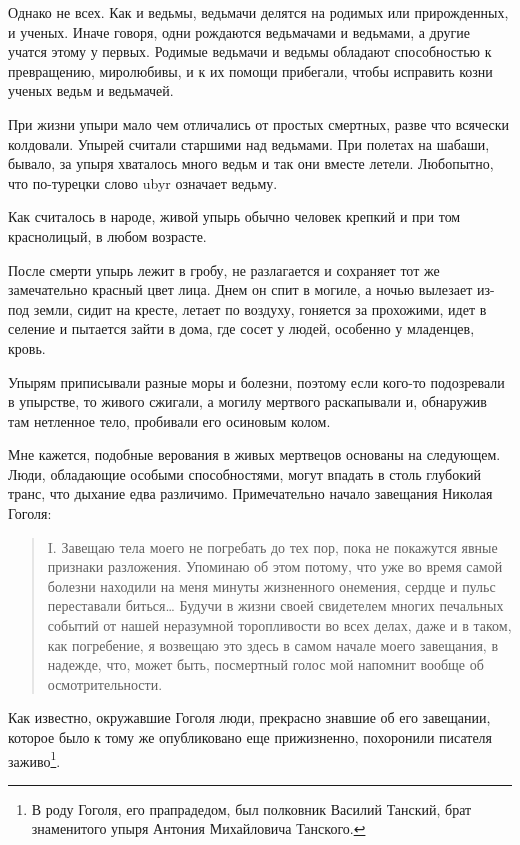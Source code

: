 \documentclass[a5paper,11pt,openany]{article}
\begin{document}
 Однако не всех. Как и ведьмы, ведьмачи делятся на родимых или прирожденных, и ученых. Иначе говоря, одни рождаются ведьмачами и ведьмами, а другие учатся этому у первых. Родимые ведьмачи и ведьмы обладают способностью к превращению, миролюбивы, и к их помощи прибегали, чтобы исправить козни ученых ведьм и ведьмачей.

   При жизни упыри мало чем отличались от простых смертных, разве что всячески колдовали. Упырей считали старшими над ведьмами. При полетах на шабаши, бывало, за упыря хваталось много ведьм и так они вместе летели. Любопытно, что по-турецки слово ubyr означает ведьму.

   Как считалось в народе, живой упырь обычно человек крепкий и при том краснолицый, в любом возрасте.

   После смерти упырь лежит в гробу, не разлагается и сохраняет тот же замечательно красный цвет лица. Днем он спит в могиле, а ночью вылезает из-под земли, сидит на кресте, летает по воздуху, гоняется за прохожими, идет в селение и пытается зайти в дома, где сосет у людей, особенно у младенцев, кровь.

   Упырям приписывали разные моры и болезни, поэтому если кого-то подозревали в упырстве, то живого сжигали, а могилу мертвого раскапывали и, обнаружив там нетленное тело, пробивали его осиновым колом.

   Мне кажется, подобные верования в живых мертвецов основаны на следующем. Люди, обладающие особыми способностями, могут впадать в столь глубокий транс, что дыхание едва различимо. Примечательно начало завещания Николая Гоголя:

\begin{quotation}
\noindent I. Завещаю тела моего не погребать до тех пор, пока не покажутся явные признаки разложения. Упоминаю об этом потому, что уже во время самой болезни находили на меня минуты жизненного онемения, сердце и пульс переставали биться… Будучи в жизни своей свидетелем многих печальных событий от нашей неразумной торопливости во всех делах, даже и в таком, как погребение, я возвещаю это здесь в самом начале моего завещания, в надежде, что, может быть, посмертный голос мой напомнит вообще об осмотрительности.
\end{quotation}

   Как известно, окружавшие Гоголя люди, прекрасно знавшие об его завещании, которое было к тому же опубликовано еще прижизненно, похоронили писателя заживо\footnote{В роду Гоголя, его прапрадедом, был полковник Василий Танский, брат знаменитого упыря Антония Михайловича Танского.}.
\end{document}
